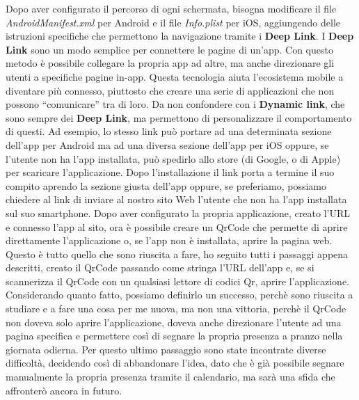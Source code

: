 \newline
Dopo aver configurato il percorso di ogni schermata, bisogna modificare il file \emph{AndroidManifest.xml} per Android e il file \emph{Info.plist} per iOS, aggiungendo delle istruzioni specifiche che permettono la navigazione tramite i \textbf{Deep Link}.\newline
\newline
I \textbf{Deep Link} sono un modo semplice per connettere le pagine di un'app.\newline
Con questo metodo è possibile collegare la propria app ad altre, ma anche direzionare gli utenti a specifiche pagine in-app.\newline
Questa tecnologia aiuta l’ecosistema mobile a diventare più connesso, piuttosto che creare una serie di applicazioni che non possono “comunicare” tra di loro.\newline
Da non confondere con i \textbf{Dynamic link}, che sono sempre dei \textbf{Deep Link}, ma permettono di personalizzare il comportamento di questi.\newline
Ad esempio, lo stesso link può portare ad una determinata sezione dell'app per Android ma ad una diversa sezione dell'app per iOS oppure, se l'utente non ha l'app installata, può spedirlo allo store (di Google, o di Apple) per scaricare l'applicazione.\newline
Dopo l'installazione il link porta a termine il suo compito aprendo la sezione giusta dell'app oppure, se preferiamo, possiamo chiedere al link di inviare al nostro sito Web l'utente che non ha l'app installata sul suo smartphone.\newline
\newline
Dopo aver configurato la propria applicazione, creato l'URL e connesso l'app al sito, ora è possibile creare un QrCode che permette di aprire direttamente l'applicazione o, se l'app non è installata, aprire la pagina web.\newline
Questo è tutto quello che sono riuscita a fare, ho seguito tutti i passaggi appena descritti, creato il QrCode passando come stringa l'URL dell'app e, se si scannerizza il QrCode con un qualsiasi lettore di codici Qr, aprire l'applicazione.\newline
\newline
Considerando quanto fatto, possiamo definirlo un successo, perchè sono riuscita a studiare e a fare una cosa per me nuova, ma non una vittoria, perchè il QrCode non doveva solo aprire l'applicazione, doveva anche direzionare l'utente ad una pagina specifica e permettere così di segnare la propria presenza a pranzo nella giornata odierna.\newline
Per questo ultimo passaggio sono state incontrate diverse difficoltà, decidendo così di abbandonare l'idea, dato che è già possibile segnare manualmente la propria presenza tramite il calendario, ma sarà una sfida che affronterò ancora in futuro.
